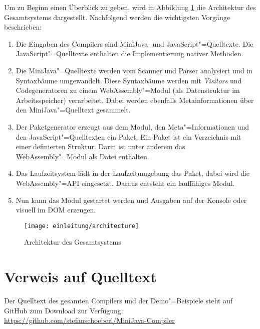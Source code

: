 Um zu Beginn einen Überblick zu geben, wird in Abbildung \ref{fig:architecture} die Architektur des Gesamtsystems dargestellt. Nachfolgend werden die wichtigsten Vorgänge beschrieben:

\begin{enumerate}
    \item Die Eingaben des Compilers sind MiniJava- und JavaScript"=Quelltexte. Die JavaScript"=Quelltexte enthalten die Implementierung nativer Methoden.
    \item Die MiniJava"=Quelltexte werden vom Scanner und Parser analysiert und in Syntaxbäume umgewandelt. Diese Syntaxbäume werden mit \emph{Visitors} und Codegeneratoren zu einem WebAssembly"=Modul (als Datenstruktur im Arbeitsspeicher) verarbeitet. Dabei werden ebenfalls Metainformationen über den MiniJava"=Quelltext gesammelt.
    \item Der Paketgenerator erzeugt aus dem Modul, den Meta"=Informationen und den JavaScript"=Quelltexten ein Paket. Ein Paket ist ein Verzeichnis mit einer definierten Struktur. Darin ist unter anderem das WebAssembly"=Modul als Datei enthalten.
    \item Das Laufzeitsystem lädt in der Laufzeitumgebung das Paket, dabei wird die WebAssembly"=API eingesetzt. Daraus entsteht ein lauffähiges Modul.
    \item Nun kann das Modul gestartet werden und Ausgaben auf der Konsole oder visuell im DOM erzeugen.
\end{enumerate}


\begin{figure}[]
    \centering
    \texttt{[image: einleitung/architecture]}
    \caption{Architektur des Gesamtsystems}
    \label{fig:architecture}
\end{figure}

\section{Verweis auf Quelltext}
Der Quelltext des gesamten Compilers und der Demo"=Beispiele steht auf GitHub zum Download zur Verfügung: \url{https://github.com/stefanschoeberl/MiniJava-Compiler}
